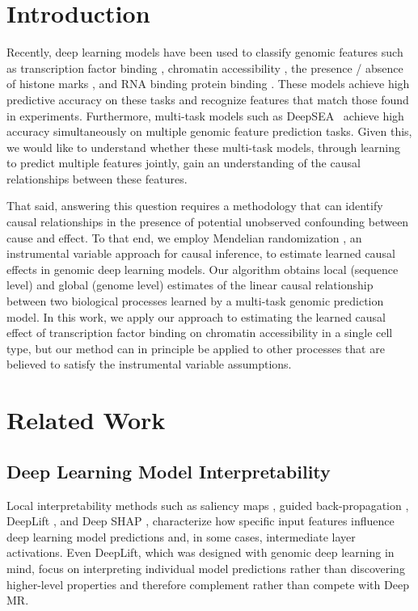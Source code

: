 \documentclass{article}
\begin{document}
\section{Introduction}
\label{introduction}
Recently, deep learning models have been used to classify genomic features such as transcription factor binding \cite{alipanahi2015predicting, zhou2015predicting}, chromatin accessibility \cite{zhou2015predicting, kelley2016basset}, the presence / absence of histone marks \cite{yin2019deephistone}, and RNA binding protein binding \cite{alipanahi2015predicting, pan2017rna, gandhi2018cdeepbind, zheng2018deep}. These models achieve high predictive accuracy on these tasks and recognize features that match those found in experiments. Furthermore, multi-task models such as DeepSEA~\cite{zhou2015predicting} achieve high accuracy simultaneously on multiple genomic feature prediction tasks. Given this, we would like to understand whether these multi-task models, through learning to predict multiple features jointly, gain an understanding of the causal relationships between these features.

That said, answering this question requires a methodology that can identify causal relationships in the presence of potential unobserved confounding between cause and effect. To that end, we employ Mendelian randomization \cite{lawlor2008mendelian}, an instrumental variable approach for causal inference, to estimate learned causal effects in genomic deep learning models. Our algorithm obtains local (sequence level) and global (genome level) estimates of the linear causal relationship between two biological processes learned by a multi-task genomic prediction model. In this work, we apply our approach to estimating the learned causal effect of transcription factor binding on chromatin accessibility in a single cell type, but our method can in principle be applied to other processes that are believed to satisfy the instrumental variable assumptions.

\section{Related Work}
\subsection{Deep Learning Model Interpretability}
Local interpretability methods such as saliency maps \cite{simonyan2013deep}, guided back-propagation \cite{springenberg2014striving}, DeepLift \cite{shrikumar2017learning}, and Deep SHAP \cite{lundberg2017unified}, characterize how specific input features influence deep learning model predictions and, in some cases, intermediate layer activations. Even DeepLift, which was designed with genomic deep learning in mind, focus on interpreting individual model predictions rather than discovering higher-level properties and therefore complement rather than compete with Deep MR.
\end{document}
